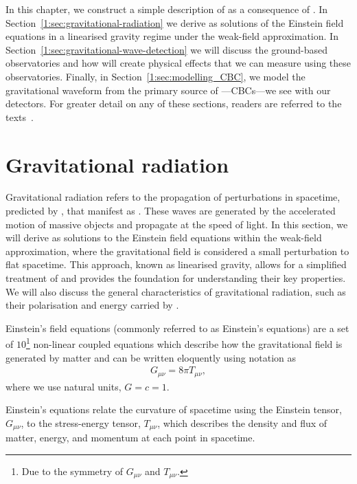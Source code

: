 In this chapter, we construct a simple description of \gws as a consequence of \GR. In Section~\ref{1:sec:gravitational-radiation} we derive \gws as solutions of the Einstein field equations in a linearised gravity regime under the weak-field approximation. In Section~\ref{1:sec:gravitational-wave-detection} we will discuss the ground-based \gwadj observatories and how \gws will create physical effects that we can measure using these observatories. Finally, in Section~\ref{1:sec:modelling_CBC}, we model the gravitational waveform from the primary source of \gws---CBCs---we see with our detectors. For greater detail on any of these sections, readers are referred to the texts~\cite{Moore_book:2012, Schutz_book:2009, Maggiore_book:2007, Creighton_book:2009}.

\section{\label{1:sec:gravitational-radiation}Gravitational radiation}

Gravitational radiation refers to the propagation of perturbations in spacetime, predicted by \GR, that manifest as \gws. These waves are generated by the accelerated motion of massive objects and propagate at the speed of light. In this section, we will derive \gws as solutions to the Einstein field equations within the weak-field approximation, where the gravitational field is considered a small perturbation to flat spacetime. This approach, known as linearised gravity, allows for a simplified treatment of \gws and provides the foundation for understanding their key properties. We will also discuss the general characteristics of gravitational radiation, such as their polarisation and energy carried by \gws.

Einstein's field equations (commonly referred to as Einstein's equations) are a set of $10$\footnote{Due to the symmetry of $G_{\mu\nu}$ and $T_{\mu\nu}$.} non-linear coupled equations which describe how the gravitational field is generated by matter and can be written eloquently using \GR notation as
%
\begin{eqnarray}
    G_{\mu\nu} = 8\pi T_{\mu\nu},
    \label{1:eqn:EFE}
\end{eqnarray}
%
where we use natural units, $G = c = 1$.

Einstein's equations relate the curvature of spacetime using the Einstein tensor, $G_{\mu\nu}$, to the stress-energy tensor, $T_{\mu\nu}$, which describes the density and flux of matter, energy, and momentum at each point in spacetime.

